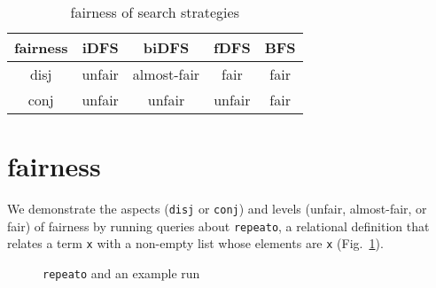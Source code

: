 \documentclass[format=acmlarge, review=true, authordraft=true]{acmart}
\newcommand{\conde}{\texttt{cond$^e$} }
\newcommand{\conj}{\texttt{conj}}
\newcommand{\disj}{\texttt{disj}}
\begin{document}
\begin{table}
	\begin{tabular}{|c|c|c|c|c|}
		\hline 
		fairness & iDFS & biDFS & fDFS & BFS \\ 
		\hline 
		disj & unfair & almost-fair & fair & fair \\ 
		\hline 
		conj & unfair & unfair & unfair & fair \\ 
		\hline 
	\end{tabular} 
	\caption{fairness of search strategies}
	\label{fairness}
\end{table}


\section{fairness}

We demonstrate the aspects (\disj{} or \conj{}) and levels (unfair, 
almost-fair, or fair) of fairness by running queries about \texttt{repeato}, a 
relational definition that relates a term \texttt{x} with a non-empty list 
whose elements are \texttt{x} (Fig.~\ref{repeato}).

\begin{figure}
	
	\caption{\texttt{repeato} and an example run}
	\label{repeato}
\end{figure}
\end{document}
